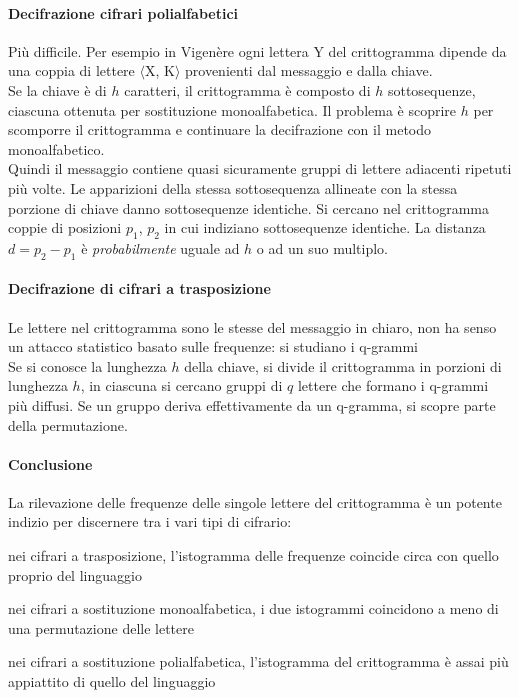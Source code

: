 \documentclass[10pt]{book}
\begin{document}
\paragraph{Decifrazione cifrari polialfabetici} Più difficile. Per esempio in Vigenère ogni lettera Y del crittogramma dipende da una coppia di lettere $\langle$X, K$\rangle$ provenienti dal messaggio e dalla chiave.\\
Se la chiave è di $h$ caratteri, il crittogramma è composto di $h$ sottosequenze, ciascuna ottenuta per sostituzione monoalfabetica. Il problema è scoprire $h$ per scomporre il crittogramma e continuare la decifrazione con il metodo monoalfabetico.\\
Quindi il messaggio contiene quasi sicuramente gruppi di lettere adiacenti ripetuti più volte. Le apparizioni della stessa sottosequenza allineate con la stessa porzione di chiave danno sottosequenze identiche. Si cercano nel crittogramma coppie di posizioni $p_1$, $p_2$ in cui indiziano sottosequenze identiche. La distanza $d = p_2 - p_1$ è \textit{probabilmente} uguale ad $h$ o ad un suo multiplo.
\paragraph{Decifrazione di cifrari a trasposizione}
Le lettere nel crittogramma sono le stesse del messaggio in chiaro, non ha senso un attacco statistico basato sulle frequenze: si studiano i q-grammi\\
Se si conosce la lunghezza $h$ della chiave, si divide il crittogramma in porzioni di lunghezza $h$, in ciascuna si cercano gruppi di $q$ lettere che formano i q-grammi più diffusi. Se un gruppo deriva effettivamente da un q-gramma, si scopre parte della permutazione.
\paragraph{Conclusione} La rilevazione delle frequenze delle singole lettere del crittogramma è un potente indizio per discernere tra i vari tipi di cifrario:
\begin{list}{}{}
	\item nei cifrari a trasposizione, l'istogramma delle frequenze coincide circa con quello proprio del linguaggio
	\item nei cifrari a sostituzione monoalfabetica, i due istogrammi coincidono a meno di una permutazione delle lettere
	\item nei cifrari a sostituzione polialfabetica, l'istogramma del crittogramma è assai più appiattito di quello del linguaggio
\end{list}
\end{document}
